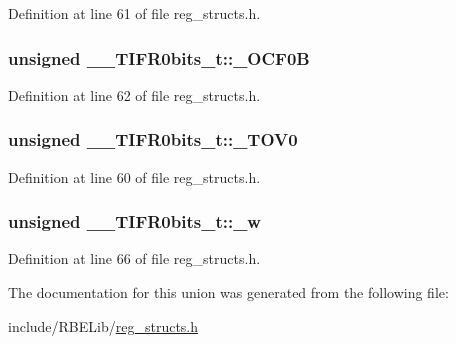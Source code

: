 Definition at line 61 of file reg\+\_\+structs.\+h.

\hypertarget{union_____t_i_f_r0bits__t_a826ce9e93c938151b8fae799e2d5cd77}{
\subsubsection[{\+\_\+\+O\+C\+F0\+B}]{\setlength{\rightskip}{0pt plus 5cm}unsigned \+\_\+\+\_\+\+T\+I\+F\+R0bits\+\_\+t\+::\+\_\+\+O\+C\+F0\+B}}\label{union_____t_i_f_r0bits__t_a826ce9e93c938151b8fae799e2d5cd77}


Definition at line 62 of file reg\+\_\+structs.\+h.

\hypertarget{union_____t_i_f_r0bits__t_a5c19aa536e98df99fe78e24d29d61de5}{
\subsubsection[{\+\_\+\+T\+O\+V0}]{\setlength{\rightskip}{0pt plus 5cm}unsigned \+\_\+\+\_\+\+T\+I\+F\+R0bits\+\_\+t\+::\+\_\+\+T\+O\+V0}}\label{union_____t_i_f_r0bits__t_a5c19aa536e98df99fe78e24d29d61de5}


Definition at line 60 of file reg\+\_\+structs.\+h.

\hypertarget{union_____t_i_f_r0bits__t_a9e1977f1af28914108e0c29e658daf4c}{
\subsubsection[{\+\_\+w}]{\setlength{\rightskip}{0pt plus 5cm}unsigned \+\_\+\+\_\+\+T\+I\+F\+R0bits\+\_\+t\+::\+\_\+w}}\label{union_____t_i_f_r0bits__t_a9e1977f1af28914108e0c29e658daf4c}


Definition at line 66 of file reg\+\_\+structs.\+h.



The documentation for this union was generated from the following file\+:\begin{DoxyCompactItemize}
\item 
include/\+R\+B\+E\+Lib/\hyperlink{reg__structs_8h}{reg\+\_\+structs.\+h}\end{DoxyCompactItemize}
